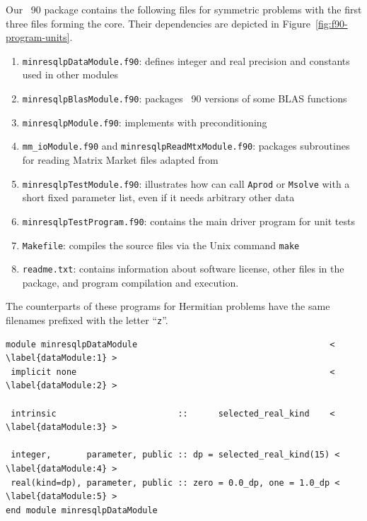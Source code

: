\documentclass{doc_acmtrans2m}
\begin{document}
Our \FORTRAN~90 package contains the following files for symmetric
problems with the first three files forming the core. Their
dependencies are depicted in Figure~\ref{fig:f90-program-units}.
\begin{enumerate}[\upshape 1.]
\item \texttt{minresqlpDataModule.f90}: defines integer and real precision
  and constants used in other modules
\item \texttt{minresqlpBlasModule.f90}: packages \FORTRAN~90
  versions of some BLAS functions 
\item \texttt{minresqlpModule.f90}: implements \MINRESQLP with
  preconditioning
\item \texttt{mm\_ioModule.f90} and
  \texttt{minresqlpReadMtxModule.f90}: packages subroutines for
  reading Matrix Market files  adapted from 
\item \texttt{minresqlpTestModule.f90}: illustrates how \MINRESQLP can
  call \texttt{Aprod} or \texttt{Msolve} with a short fixed parameter
  list, even if it needs arbitrary other data
\item \texttt{minresqlpTestProgram.f90}: contains the main driver
  program for unit tests
\item \texttt{Makefile}: compiles the \FORTRAN source files via the
  Unix command \texttt{make}
\item \texttt{readme.txt}: contains information about
  software license, other files in the package, and program
  compilation and execution.
\end{enumerate}
The counterparts of these programs for Hermitian problems have the
same filenames prefixed with the letter ``\texttt{z}''.


\begin{lstlisting}[frame=TB,float,caption=Partial \FORTRAN~90 code listing
of minresqlpDataModule.,label=code:dataModule]
module minresqlpDataModule                                      < \label{dataModule:1} >
 implicit none                                                  < \label{dataModule:2} >

 intrinsic                        ::      selected_real_kind    < \label{dataModule:3} >

 integer,       parameter, public :: dp = selected_real_kind(15) < \label{dataModule:4} >
 real(kind=dp), parameter, public :: zero = 0.0_dp, one = 1.0_dp < \label{dataModule:5} >
end module minresqlpDataModule
\end{lstlisting}
\end{document}
